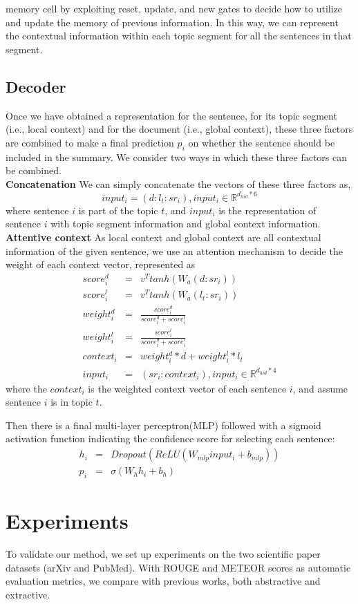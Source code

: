 memory cell by exploiting reset, update, and new gates to decide how to utilize and update the memory of previous information. In this way, we can represent the contextual information within each topic segment for all the sentences in that segment.
\subsection{Decoder}
Once we have obtained a representation for the sentence, for its topic segment (i.e., local context) and for the document (i.e., global context), these three factors are combined to make a final prediction $p_i$ on whether the sentence should be included in the summary. We consider two ways in which these three factors can be combined.\\
\textbf{Concatenation} We can simply concatenate the vectors of these three factors as, 
$$input_i = (d:l_t:sr_i), input_i \in\mathbb{R}^{d_{hid}*6}$$
where sentence $i$ is part of the topic $t$, and $input_i$ is the representation of sentence $i$ with topic segment information and global context information.\\
\textbf{Attentive context} As local context and global context are all contextual information of the given sentence, we use an attention mechanism to decide the weight of each context vector, represented as
\begin{eqnarray*}
score^d_i &=& v^Ttanh(W_a (d:sr_i))\\
score^l_i &=& v^Ttanh(W_a (l_t:sr_i))\\
weight^d_i &=& \frac{score^d_i}{score^d_i+score^l_i}\\
weight^l_i &=& \frac{score^l_i}{score^d_i+score^l_i}\\
context_i &=& weight^d_i*d+weight^l_i*l_t\\
input_i &=& (sr_i:context_i), input_i \in \mathbb{R}^{d_{hid}*4}
\end{eqnarray*}
where the $context_i$ is the weighted context vector of each sentence $i$, and assume sentence $i$ is in topic $t$.

Then there is a final multi-layer perceptron(MLP) followed with a sigmoid activation function indicating the confidence score for selecting each sentence: 
\begin{eqnarray*}
h_i &=& Dropout(ReLU(W_{mlp} input_i+b_{mlp}))\\
p_i &=& \sigma(W_h h_i +b_h)
\end{eqnarray*}

\section{Experiments}
To validate our method, we set up experiments on the two scientific paper datasets (arXiv and PubMed). With ROUGE and METEOR scores as automatic evaluation metrics, we compare with previous works, both abstractive and extractive.
